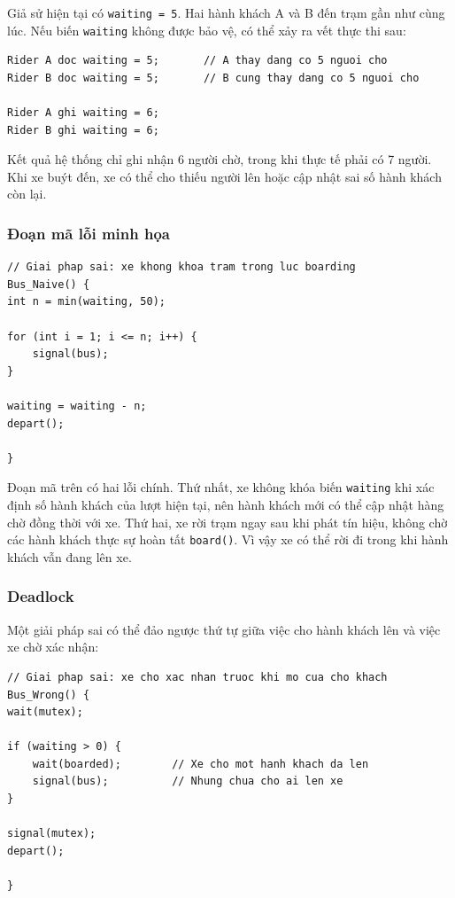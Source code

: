 Giả sử hiện tại có \texttt{waiting = 5}. Hai hành khách A và B đến trạm
gần như cùng lúc. Nếu biến \texttt{waiting} không được bảo vệ, có thể
xảy ra vết thực thi sau:

\begin{lstlisting}
Rider A doc waiting = 5;       // A thay dang co 5 nguoi cho
Rider B doc waiting = 5;       // B cung thay dang co 5 nguoi cho

Rider A ghi waiting = 6;
Rider B ghi waiting = 6;
\end{lstlisting}

Kết quả hệ thống chỉ ghi nhận 6 người chờ, trong khi thực tế phải có
7 người. Khi xe buýt đến, xe có thể cho thiếu người lên hoặc cập nhật
sai số hành khách còn lại.

\subsubsection*{Đoạn mã lỗi minh họa}

\begin{lstlisting}
// Giai phap sai: xe khong khoa tram trong luc boarding
Bus_Naive() {
int n = min(waiting, 50);

for (int i = 1; i <= n; i++) {
    signal(bus);
}

waiting = waiting - n;
depart();

}
\end{lstlisting}

Đoạn mã trên có hai lỗi chính. Thứ nhất, xe không khóa biến
\texttt{waiting} khi xác định số hành khách của lượt hiện tại, nên hành
khách mới có thể cập nhật hàng chờ đồng thời với xe. Thứ hai, xe rời
trạm ngay sau khi phát tín hiệu, không chờ các hành khách thực sự hoàn
tất \texttt{board()}. Vì vậy xe có thể rời đi trong khi hành khách vẫn
đang lên xe.

\subsubsection*{Deadlock}

Một giải pháp sai có thể đảo ngược thứ tự giữa việc cho hành khách lên
và việc xe chờ xác nhận:

\begin{lstlisting}
// Giai phap sai: xe cho xac nhan truoc khi mo cua cho khach
Bus_Wrong() {
wait(mutex);

if (waiting > 0) {
    wait(boarded);        // Xe cho mot hanh khach da len
    signal(bus);          // Nhung chua cho ai len xe
}

signal(mutex);
depart();

}
\end{lstlisting}

